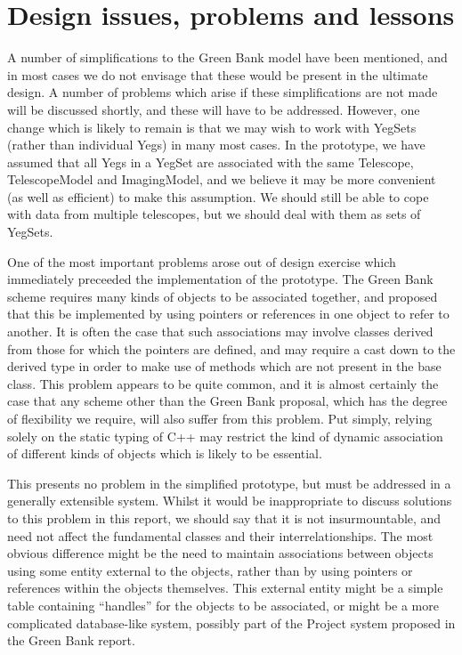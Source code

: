 \section {Design issues, problems and lessons}

A number of simplifications to the Green Bank model have been
mentioned, and in most cases we do not envisage that these would be
present in the ultimate design.  A number of problems which arise if
these simplifications are not made will be discussed shortly, and
these will have to be addressed.  However, one change which is likely
to remain is that we may wish to work with YegSets (rather than
individual Yegs) in many most cases.  In the prototype, we have
assumed that all Yegs in a YegSet are associated with the same
Telescope, TelescopeModel and ImagingModel, and we believe it may be
more convenient (as well as efficient) to make this assumption.  We
should still be able to cope with data from multiple telescopes, but
we should deal with them as sets of YegSets.

One of the most important problems arose out of design exercise which
immediately preceeded the implementation of the prototype.  The Green
Bank scheme requires many kinds of objects to be associated together,
and proposed that this be implemented by using pointers or references
in one object to refer to another.  It is often the case that such
associations may involve classes derived from those for which the
pointers are defined, and may require a cast down to the derived type
in order to make use of methods which are not present in the base
class.  This problem appears to be quite common, and it is almost
certainly the case that any scheme other than the Green Bank proposal,
which has the degree of flexibility we require, will also suffer from
this problem.  Put simply, relying solely on the static typing of C++
may restrict the kind of dynamic association of different kinds of
objects which is likely to be essential.

This presents no problem in the simplified prototype, but must be
addressed in a generally extensible system.  Whilst it would be
inappropriate to discuss solutions to this problem in this report, we
should say that it is not insurmountable, and need not affect the
fundamental classes and their interrelationships.  The most obvious
difference might be the need to maintain associations between objects
using some entity external to the objects, rather than by using
pointers or references within the objects themselves.  This external
entity might be a simple table containing ``handles'' for the objects
to be associated, or might be a more complicated database-like system,
possibly part of the Project system proposed in the Green Bank report.

